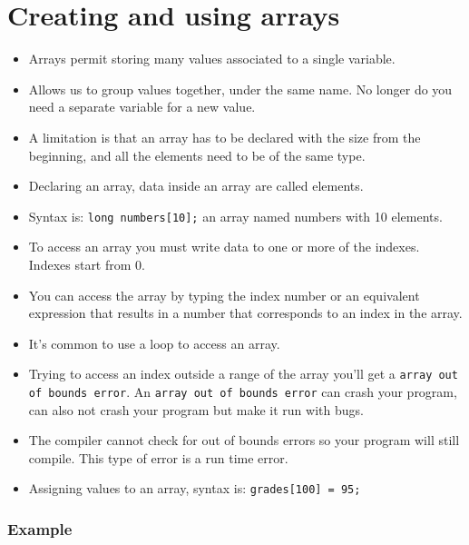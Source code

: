 \section{Creating and using arrays}
\begin{itemize}
    \item Arrays permit storing many values associated to a single variable. 
    \item Allows us to group values together, under the same name. No longer do you need a separate variable for a new value. 
    \item A limitation is that an array has to be declared with the size from the beginning, and all the elements need to be of the same type. 
    \item Declaring an array, data inside an array are called elements. 
    \item Syntax is: \texttt{long numbers[10];} an array named numbers with 10 elements. 
    \item To access an array you must write data to one or more of the indexes. Indexes start from 0. 
    \item You can access the array by typing the index number or an equivalent expression that results in a number that corresponds to an index in the array. 
    \item It's common to use a loop to access an array. 
    \item Trying to access an index outside a range of the array you'll get a \verb|array out of bounds error|. An \verb|array out of bounds error| can crash your program, can also not crash your program but make it run with bugs. 
    \item The compiler cannot check for out of bounds errors so your program will still compile. This type of error is a run time error. 
    \item Assigning values to an array, syntax is: \texttt{grades[100] = 95;} 
\end{itemize}
\subsubsection{Example}

